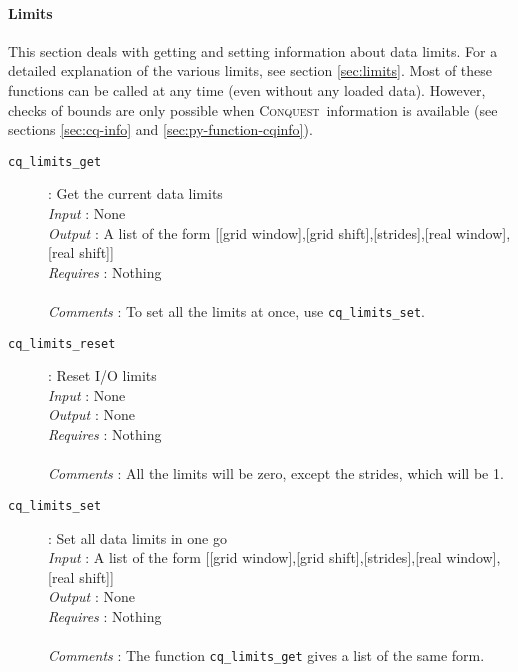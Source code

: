 \documentclass[a4paper,notitlepage,11pt]{article}
\def\CQ{\textsc{Conquest}}
\begin{document}
\paragraph{Limits}
\label{sec:py-function-io-limits}

This section deals with getting and setting information about data limits. 
For a detailed explanation of the various limits, see section \ref{sec:limits}.
Most of these functions can be called at any time (even without any loaded data).
However, checks of bounds are only possible when \CQ\ information is available
(see sections \ref{sec:cq-info} and \ref{sec:py-function-cqinfo}).\\

\begin{description}
\item[\texttt{cq\_limits\_get}]: Get the current data limits\\
  \emph{Input} : None\\
  \emph{Output} : A list of the form [[grid window],[grid shift],[strides],[real window],[real shift]]\\
  \emph{Requires} : Nothing\\
  \\
  \emph{Comments} : To set all the limits at once, use \texttt{cq\_limits\_set}.
\end{description}

\begin{description}
\item[\texttt{cq\_limits\_reset}]: Reset I/O limits\\
  \emph{Input} : None\\
  \emph{Output} : None\\
  \emph{Requires} : Nothing\\
  \\
  \emph{Comments} : All the limits will be zero, except the strides, which will be 1.
\end{description}

\begin{description}
\item[\texttt{cq\_limits\_set}]: Set all data limits in one go\\
  \emph{Input} : A list of the form [[grid window],[grid shift],[strides],[real window],[real shift]]\\
  \emph{Output} : None\\
  \emph{Requires} : Nothing\\
  \\
  \emph{Comments} : The function \texttt{cq\_limits\_get} gives a list of the same form. 
\end{description}
\end{document}
